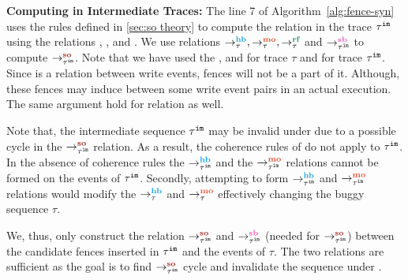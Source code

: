 \noindent\textbf{Computing \lso in Intermediate Traces:} 
The line 7 of Algorithm~\ref{alg:fence-syn} uses the rules defined in 
\textsection\ref{sec:so theory} to compute the \lso relation in the trace 
$ {\tau}^{\mathtt{im}} $ using the relations \lhb, \lmo, \lrf and \lsb. 
We use relations $ \setHB, \setMO, \setRF $ and $ \seqb{\im{\tau}}{}{} $ to compute $ \so{\im{\tau}}{}{} $.
Note that we have used the \lhb, \lmo and \lrf for trace $ \tau $ and \lsb 
for trace $ {\tau}^{\mathtt{im}} $. 
Since \lmo is a relation between write events, fences will not be a part 
of it. Although, these fences may induce \lmo between some write event 
pairs in an actual execution. 
The same argument hold for \lrf relation as well.
 
\newline
Note that, the intermediate sequence ${\tau}^{\mathtt{im}}$ may be invalid under 
\cc due to a possible cycle in the $\so{\im{\tau}}{}{}$ relation. 
As a result, the coherence rules of \cc do not apply to ${\tau}^{\mathtt{im}}$. 
In the absence of \cc coherence rules the $\hb{\im{\tau}}{}{}$ and 
the $\mo{\im{\tau}}{}{}$ relations cannot be formed on the events of 
${\tau}^{\mathtt{im}}$.
%
Secondly, attempting to form $\hb{\im{\tau}}{}{}$ and 
$\mo{\im{\tau}}{}{}$ relations would modify the $\setHB$ and $\setMO$
effectively changing the buggy sequence $\tau$.

We, thus, only construct the relation $\so{\im{\tau}}{}{}$ and 
$\seqb{\im{\tau}}{}{}$ (needed for $\so{\im{\tau}}{}{}$) 
between the candidate fences inserted in ${\tau}^{\mathtt{im}}$ and the events
of $\tau$. The two relations are sufficient as the goal is to
find $\so{\im{\tau}}{}{}$ cycle and invalidate the sequence under \cc.



